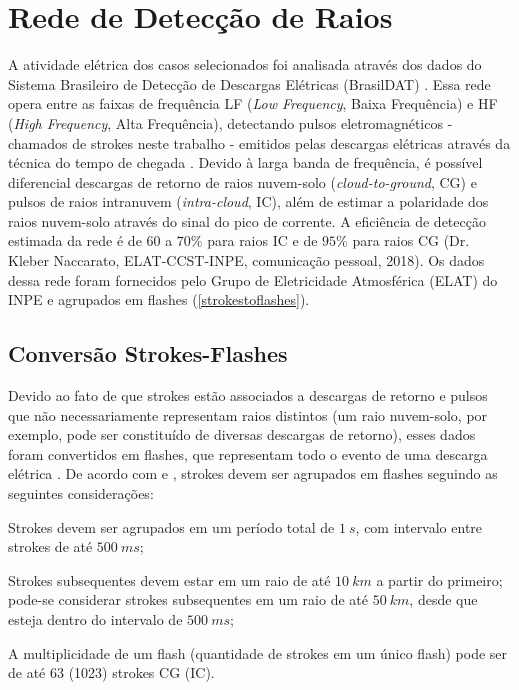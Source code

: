 \section{Rede de Detecção de Raios}\label{raios}

A atividade elétrica dos casos selecionados foi analisada através dos dados do Sistema Brasileiro de Detecção de Descargas Elétricas (BrasilDAT) \cite{Naccarato2014}. Essa rede opera entre as faixas de frequência LF (\textit{Low Frequency}, Baixa Frequência) e HF (\textit{High Frequency}, Alta Frequência), detectando pulsos eletromagnéticos - chamados de strokes neste trabalho - emitidos pelas descargas elétricas através da técnica do tempo de chegada \cite{Lewis1960}. Devido à larga banda de frequência, é possível diferencial descargas de retorno de raios nuvem-solo (\textit{cloud-to-ground}, CG) e pulsos de raios intranuvem (\textit{intra-cloud}, IC), além de estimar a polaridade dos raios nuvem-solo através do sinal do pico de corrente. A eficiência de detecção estimada da rede é de $60$ a $70\%$ para raios IC e de $95\%$ para raios CG (Dr. Kleber Naccarato, ELAT-CCST-INPE, comunicação pessoal, 2018). Os dados dessa rede foram fornecidos pelo Grupo de Eletricidade Atmosférica (ELAT) do INPE e agrupados em flashes (\autoref{strokestoflashes}).

\subsection{Conversão Strokes-Flashes}\label{strokestoflashes}

Devido ao fato de que strokes estão associados a descargas de retorno e pulsos que não necessariamente representam raios distintos (um raio nuvem-solo, por exemplo, pode ser constituído de diversas descargas de retorno), esses dados foram convertidos em flashes, que representam todo o evento de uma descarga elétrica \cite{MacGorman1998b}. De acordo com  e , strokes devem ser agrupados em flashes seguindo as seguintes considerações:

\begin{alineas}
	\item Strokes devem ser agrupados em um período total de $1\:s$, com intervalo entre strokes de até $500\:ms$;
	\item Strokes subsequentes devem estar em um raio de até $10\:km$ a partir do primeiro; pode-se considerar strokes subsequentes em um raio de até $50\:km$, desde que esteja dentro do intervalo de $500\:ms$;
	\item A multiplicidade de um flash (quantidade de strokes em um único flash) pode ser de até 63 (1023) strokes CG (IC).
\end{alineas} 

